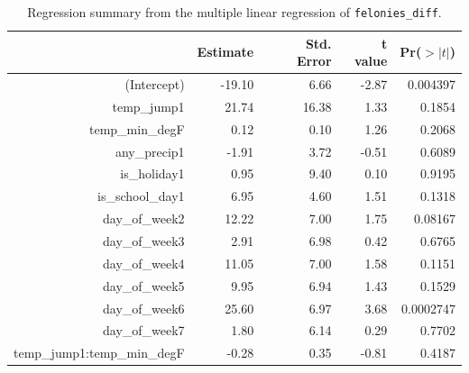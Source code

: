 \documentclass[11pt,notitlepage]{article}
\newenvironment{codeSmall}%
   {\par\noindent\adjustbox{margin=1ex,bgcolor=shadecolor,margin=0ex \medskipamount}\bgroup\minipage\linewidth\verbatim\footnotesize}%
   {\endverbatim\endminipage\egroup}
\begin{document}



\begin{table}[ht]
\vspace*{-1mm}
\footnotesize
\centering
\begin{tabular}{rrrrr}
  \hline
 & Estimate & Std. Error & t value & Pr($>|t|$) \\ 
  \hline
(Intercept) & -19.10 & 6.66 & -2.87 & 0.004397 \\ 
  temp\_jump1 & 21.74 & 16.38 & 1.33 & 0.1854 \\ 
  temp\_min\_degF & 0.12 & 0.10 & 1.26 & 0.2068 \\ 
  any\_precip1 & -1.91 & 3.72 & -0.51 & 0.6089 \\ 
  is\_holiday1 & 0.95 & 9.40 & 0.10 & 0.9195 \\ 
  is\_school\_day1 & 6.95 & 4.60 & 1.51 & 0.1318 \\ 
  day\_of\_week2 & 12.22 & 7.00 & 1.75 & 0.08167 \\ 
  day\_of\_week3 & 2.91 & 6.98 & 0.42 & 0.6765 \\ 
  day\_of\_week4 & 11.05 & 7.00 & 1.58 & 0.1151 \\ 
  day\_of\_week5 & 9.95 & 6.94 & 1.43 & 0.1529 \\ 
  day\_of\_week6 & 25.60 & 6.97 & 3.68 & 0.0002747 \\ 
  day\_of\_week7 & 1.80 & 6.14 & 0.29 & 0.7702 \\ 
  temp\_jump1:temp\_min\_degF & -0.28 & 0.35 & -0.81 & 0.4187 \\ 
   \hline
\end{tabular}
\captionsetup{width=0.9\textwidth}
\vspace*{-2mm}
\caption{Regression summary from the multiple linear regression of \texttt{felonies_diff}.}
\label{tab:lmd2}   
\vspace*{-3mm}
\end{table}
\end{document}
